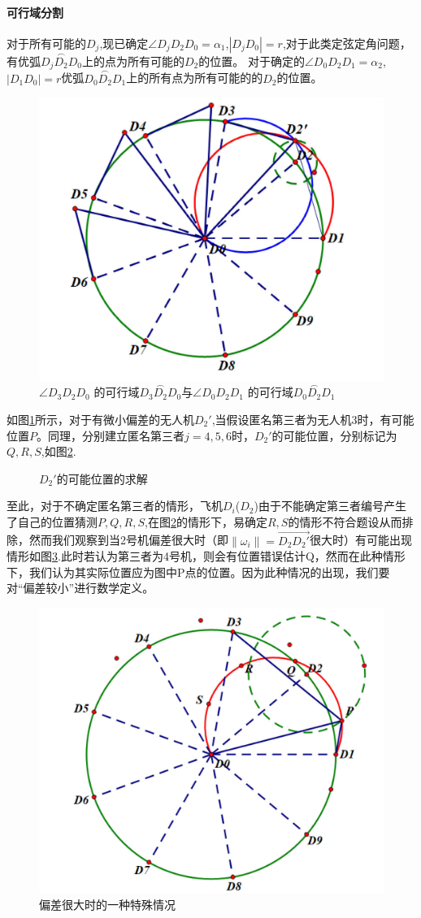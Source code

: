 \documentclass{cumcmthesis}
\begin{document}
			\paragraph{可行域分割}
			对于所有可能的$D_j$,现已确定$\angle D_jD_2D_0 = \alpha_1$,$|D_jD_0|= r$,对于此类定弦定角问题，有优弧$\overset{\frown}{D_jD_2D_0}$上的点为所有可能的$D_2$的位置。
			对于确定的$\angle D_0D_2D_1 = \alpha_2$,$|D_1D_0|= r$优弧$\overset{\frown}{D_0D_2D_1}$上的所有点为所有可能的的$D_2$的位置。
			\begin{figure}[htb]
				\centering
				\includegraphics[width=0.5\linewidth]{./figures/3}
				\caption{$\angle D_3D_2D_0$ 的可行域$\overset{\frown}{D_3D_2D_0}$与$\angle D_0D_2D_1$ 的可行域$\overset{\frown}{D_0D_2D_1}$}
				\label{fig3}
			\end{figure}
		
		
			如图\ref{fig3}所示，对于有微小偏差的无人机$D_2'$,当假设匿名第三者为无人机3时，有可能位置$P$。同理，分别建立匿名第三者$j=4,5,6$时，$D_2'$的可能位置，分别标记为$Q,R,S$,如图\ref{fig4}.
			
			\begin{figure}[htb]
				\centering
				\caption{$D_2'$的可能位置的求解}
				\label{fig4}
			\end{figure}
			
			至此，对于不确定匿名第三者的情形，飞机$D_i$($D_2$)由于不能确定第三者编号产生了自己的位置猜测$P,Q,R,S$,在图\ref{fig4}的情形下，易确定$R,S$的情形不符合题设从而排除，然而我们观察到当2号机偏差很大时（即$\lVert\omega_i\rVert =\overrightarrow{D_2D_2'} $很大时）有可能出现情形如图\ref{fig6}.此时若认为第三者为4号机，则会有位置错误估计Q，然而在此种情形下，我们认为其实际位置应为图中P点的位置。因为此种情况的出现，我们要对“偏差较小”进行数学定义。
			\begin{figure}[htb]
				\centering
				\includegraphics[width=0.5\linewidth]{./figures/6}
				\caption{偏差很大时的一种特殊情况}
				\label{fig6}
			\end{figure}
		
\end{document}
